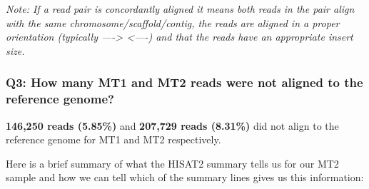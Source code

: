 \documentclass[11pt]{article}
\begin{document}
\textit{Note: If a read pair is concordantly aligned it means both reads
in the pair align with the same chromosome/scaffold/contig, the reads
are aligned in a proper orientation (typically ----\textgreater{}
\textless----) and that the reads have an appropriate insert size.}

\newpage

    \hypertarget{q3-how-many-mt1-and-mt2-reads-were-not-aligned-to-the-reference-genome}{%
\subsubsection{Q3: How many MT1 and MT2 reads were not aligned to the
reference
genome?}\label{q3-how-many-mt1-and-mt2-reads-were-not-aligned-to-the-reference-genome}}

\textbf{146,250 reads (5.85\%)} and \textbf{207,729 reads (8.31\%)} did
not align to the reference genome for MT1 and MT2 respectively.

    Here is a brief summary of what the HISAT2 summary tells us for our MT2
sample and how we can tell which of the summary lines gives us this
information:
\end{document}
